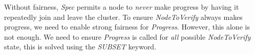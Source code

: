 Without fairness, \textit{Spec} permits a node to \textit{never} make progress
by having it repeatedly join and leave the cluster. To ensure 
\textit{NodeToVerify} always makes progress, we need to enable strong fairness 
for \textit{Progress}. However, this alone is not enough. We need to ensure
\textit{Progress} is called for \textit{all} possible \textit{NodeToVerify}
state, this is solved using the \textit{SUBSET} keyword.

% 


